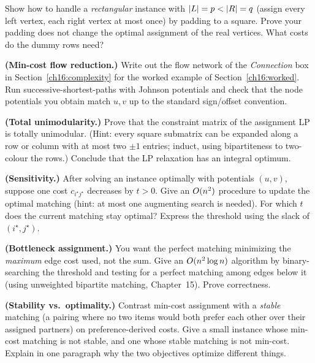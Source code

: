 \begin{exercise}
Show how to handle a \emph{rectangular} instance with $\lvert L\rvert=p<\lvert R\rvert=q$ (assign every left vertex, each right vertex at most once) by padding to a square. Prove your padding does not change the optimal assignment of the real vertices. What costs do the dummy rows need?
\end{exercise}

\begin{exercise}
\textbf{(Min-cost flow reduction.)} Write out the flow network of the \emph{Connection} box in Section~\ref{ch16:complexity} for the worked example of Section~\ref{ch16:worked}. Run successive-shortest-paths with Johnson potentials and check that the node potentials you obtain match $u,v$ up to the standard sign/offset convention.
\end{exercise}

\begin{exercise}
\textbf{(Total unimodularity.)} Prove that the constraint matrix of the assignment LP is totally unimodular. (Hint: every square submatrix can be expanded along a row or column with at most two $\pm1$ entries; induct, using bipartiteness to two-colour the rows.) Conclude that the LP relaxation has an integral optimum.
\end{exercise}

\begin{exercise}
\textbf{(Sensitivity.)} After solving an instance optimally with potentials $(u,v)$, suppose one cost $c_{i^\star j^\star}$ decreases by $t>0$. Give an $O(n^2)$ procedure to update the optimal matching (hint: at most one augmenting search is needed). For which $t$ does the current matching stay optimal? Express the threshold using the slack of $(i^\star,j^\star)$.
\end{exercise}

\begin{exercise}
\textbf{(Bottleneck assignment.)} You want the perfect matching minimizing the \emph{maximum} edge cost used, not the sum. Give an $O(n^2 \log n)$ algorithm by binary-searching the threshold and testing for a perfect matching among edges below it (using unweighted bipartite matching, Chapter~15). Prove correctness.
\end{exercise}

\begin{exercise}
\textbf{(Stability vs.\ optimality.)} Contrast min-cost assignment with a \emph{stable} matching (a pairing where no two items would both prefer each other over their assigned partners) on preference-derived costs. Give a small instance whose min-cost matching is not stable, and one whose stable matching is not min-cost. Explain in one paragraph why the two objectives optimize different things.
\end{exercise}

